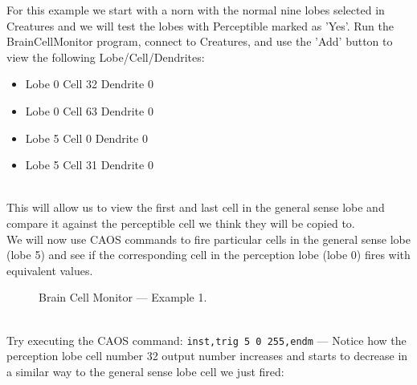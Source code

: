 \documentclass[11pt,twoside,a4paper]{article}
\begin{document}
\begin{minipage}[h]{9.00cm}
	For this example we start with a norn with the normal nine lobes selected in Creatures and we will test the lobes with Perceptible marked as 'Yes'. Run the BrainCellMonitor program, connect to Creatures, and use the 'Add' button to view the following Lobe/Cell/Dendrites:
	\begin{itemize}
		\item Lobe 0 Cell 32 Dendrite 0
		\item Lobe 0 Cell 63 Dendrite 0
		\item Lobe 5 Cell 0 Dendrite 0
		\item Lobe 5 Cell 31 Dendrite 0
	\end{itemize} ~\\
	
	This will allow us to view the first and last cell in the general sense lobe and compare it against the perceptible cell we think they will be copied to. ~\\
	
	We will now use CAOS commands to fire particular cells in the general sense lobe (lobe 5) and see if the corresponding cell in the perception lobe (lobe 0) fires with equivalent values. ~\\
\end{minipage} \hfill \begin{minipage}[h]{9.75cm}
	\begin{figure}[H]
		\centerline {}
		\caption{Brain Cell Monitor --- Example 1. }
		\label{fig:perceptionLobeExample1}
	\end{figure}
\end{minipage} ~\\

Try executing the CAOS command: \texttt{inst,trig 5 0 255,endm} --- Notice how the perception lobe cell number 32 output number increases and starts to decrease in a similar way to the general sense lobe cell we just fired: ~\\
\end{document}
